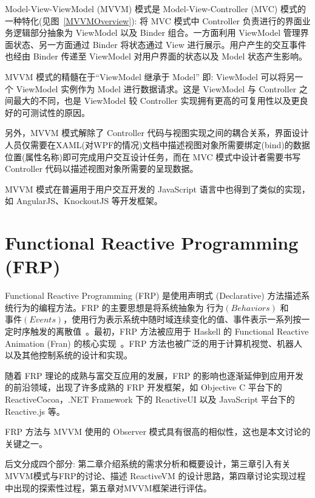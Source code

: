 Model-View-ViewModel (MVVM) 模式是 Model-View-Controller (MVC) 模式的一种特化(见图~\ref{MVVMOverview}): 将 MVC 模式中 Controller 负责进行的界面业务逻辑部分抽象为 ViewModel 以及 Binder 组合。一方面利用 ViewModel 管理界面状态、另一方面通过 Binder 将状态通过 View 进行展示。用户产生的交互事件也经由 Binder 传递至 ViewModel 对用户界面的状态以及 Model 状态产生影响。

MVVM 模式的精髓在于“ViewModel 继承于 Model” 即: ViewModel 可以将另一个 ViewModel 实例作为 Model 进行数据请求。这是 ViewModel 与 Controller 之间最大的不同，也是 ViewModel 较 Controller 实现拥有更高的可复用性以及更良好的可测试性的原因。

另外，MVVM 模式解除了 Controller 代码与视图实现之间的耦合关系，界面设计人员仅需要在XAML(对WPF的情况)文档中描述视图对象所需要绑定(bind)的数据位置(属性名称)即可完成用户交互设计任务，而在 MVC 模式中设计者需要书写 Controller 代码以描述视图对象所需要的呈现数据。

MVVM 模式在普遍用于用户交互开发的 JavaScript 语言中也得到了类似的实现，如 AngularJS、KnockoutJS 等开发框架。

\section{Functional Reactive Programming (FRP)}

Functional Reactive Programming (FRP) 是使用声明式 (Declarative) 方法描述系统行为的编程方法。FRP 的主要思想是将系统抽象为 $行为(Behaviors)$ 和 $事件(Events)$，使用行为表示系统中随时域连续变化的值、事件表示一系列按一定时序触发的离散值~\cite{Wan:2000:FRP:358438.349331}。最初，FRP 方法被应用于 Haskell 的 Functional Reactive Animation (Fran) 的核心实现~\cite{Elliott:1997:FRA:258949.258973}。FRP 方法也被广泛的用于计算机视觉、机器人以及其他控制系统的设计和实现。

随着 FRP 理论的成熟与富交互应用的发展，FRP 的影响也逐渐延伸到应用开发的前沿领域，出现了许多成熟的 FRP 开发框架，如 Objective C 平台下的 ReactiveCocoa，.NET Framework 下的 ReactiveUI 以及 JavaScript 平台下的 Reactive.js 等。

FRP 方法与 MVVM 使用的 Observer 模式具有很高的相似性，这也是本文讨论的关键之一。

后文分成四个部分: 第二章介绍系统的需求分析和概要设计，第三章引入有关MVVM模式与FRP的讨论、描述 ReactiveVM 的设计思路，第四章讨论实现过程中出现的探索性过程，第五章对MVVM框架进行评估。

